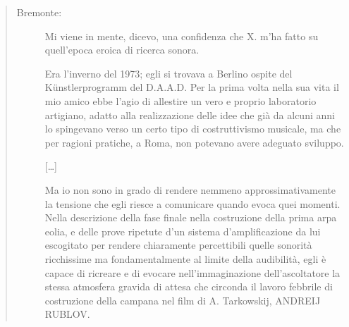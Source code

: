 \begin{quote}
  \begin{sf}
    \small
    \begin{description}
      \item[Bremonte:] Mi viene in mente, dicevo, una confidenza che X. m’ha
      fatto su quell’epoca eroica di ricerca sonora.

      Era l’inverno del 1973; egli si trovava a Berlino ospite del
      Künstlerprogramm del D.A.A.D. Per la prima volta nella sua vita il mio
      amico ebbe l’agio di allestire un vero e proprio laboratorio artigiano,
      adatto alla realizzazione delle idee che già da alcuni anni lo spingevano
      verso un certo tipo di costruttivismo musicale, ma che per ragioni
      pratiche, a Roma, non potevano avere adeguato sviluppo.

      [\ldots]


      Ma io non sono in grado di rendere nemmeno approssimativamente la tensione
      che egli riesce a comunicare quando evoca quei momenti. Nella descrizione
      della fase finale nella costruzione della prima arpa eolia, e delle prove
      ripetute d’un sistema d’amplificazione da lui escogitato per rendere
      chiaramente percettibili quelle sonorità ricchissime ma fondamentalmente
      al limite della audibilità, egli è capace di ricreare e di evocare
      nell’immaginazione dell’ascoltatore la stessa atmosfera gravida di attesa
      che circonda il lavoro febbrile di costruzione della campana nel film di
      A. Tarkowskij, ANDREIJ RUBLOV.
    \end{description}
  \end{sf}
\end{quote}

